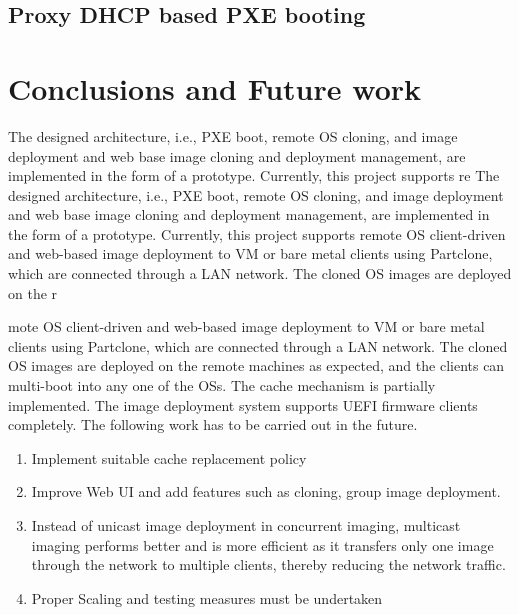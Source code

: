 \documentclass[a4paper,12pt]{article}
\begin{document}
\subsection{ Proxy DHCP based PXE booting}

\newpage
\section{\fontsize{16pt}{1em} Conclusions and Future work}
 The designed architecture, i.e., PXE boot, remote OS cloning, and image deployment and web base image cloning and deployment management, are implemented in the form of a prototype. Currently, this project supports re The designed architecture, i.e., PXE boot, remote OS cloning, and image deployment and web base image cloning and deployment management, are implemented in the form of a prototype. Currently, this project supports remote OS client-driven and web-based image deployment to VM or bare metal clients using Partclone, which are connected through a LAN network. The cloned OS images are deployed on the r

mote OS client-driven and web-based image deployment to VM or bare metal clients using Partclone, which are connected through a LAN network. The cloned OS images are deployed on the remote machines as expected, and the clients can multi-boot into any one of the OSs. The cache mechanism is partially implemented. The image deployment system supports UEFI firmware clients completely. The following work has to be carried out in the future.
\begin{enumerate}
    \item Implement suitable cache replacement policy  
    \item Improve Web UI and add features such as cloning, group image deployment.
    \item Instead of unicast image deployment in concurrent imaging, multicast imaging performs better and is more efficient as it transfers only one image through the network to multiple clients, thereby reducing the network traffic.
    \item Proper Scaling and testing measures must be undertaken
\end{enumerate}
\end{document}
